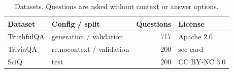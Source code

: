 \begin{table}[t]
\centering
\footnotesize
\caption{Datasets. Questions are asked without context or answer options.}
\label{tab:data}
\begin{tabular}{llrl}
\toprule
Dataset & Config / split & Questions & License \\
\midrule
TruthfulQA & generation / validation & 717 & Apache 2.0 \\
TriviaQA & rc.nocontext / validation & 200 & see card \\
SciQ & test & 200 & CC BY-NC 3.0 \\
\bottomrule
\end{tabular}
\end{table}
